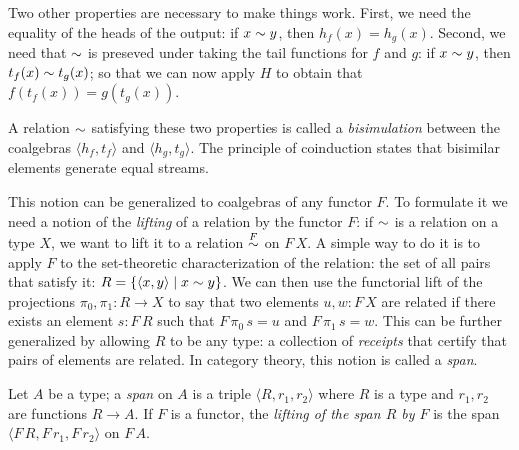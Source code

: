 
Two other properties are necessary to make things work.
First, we need the equality of the heads of the output: if $x\sim y$, then $h_f(x) = h_g(x)$.
Second, we need that $\sim$ is preseved under taking the tail functions for $f$ and $g$: if $x\sim y$, then $t_f(x) \sim t_g(x)$; so that we can now apply $H$ to obtain that $f(t_f(x)) = g(t_g(x))$.

A relation $\sim$ satisfying these two properties is called a {\em bisimulation} between the coalgebras $\langle h_f, t_f\rangle$ and $\langle h_g, t_g\rangle$.
The principle of coinduction states that bisimilar elements generate equal streams.

This notion can be generalized to coalgebras of any functor $F$.
To formulate it we need a notion of the {\em lifting} of a relation by the functor $F$: if $\sim$ is a relation on a type $X$, we want to lift it to a relation $\mathrel{\stackrel{F}{\sim}}$ on $F\,X$.
A simple way to do it is to apply $F$ to the set-theoretic characterization of the relation: the set of all pairs that satisfy it: $R = \{ \langle x, y \rangle \mid x \sim y\}$.
We can then use the functorial lift of the projections $\pi_0, \pi_1:R \rightarrow X$ to say that two elements $u,w:F\,X$ are related if there exists an element $s:F\,R$ such that $F\,\pi_0\,s = u$ and $F\,\pi_1\,s = w$.
This can be further generalized by allowing $R$ to be any type: a collection of {\em receipts} that certify that pairs of elements are related.
In category theory, this notion is called a {\em span}.

\begin{definition}\label{def:span}
Let $A$ be a type; a {\em span} on $A$ is a triple $\langle R,r_1,r_2\rangle$ where $R$ is a type and $r_1, r_2$ are functions $R\rightarrow A$.
If $F$ is a functor, the {\em lifting of the span $R$ by $F$} is the span $\langle F\,R,F\,r_1,F\,r_2\rangle$ on $F\,A$.
\end{definition}

